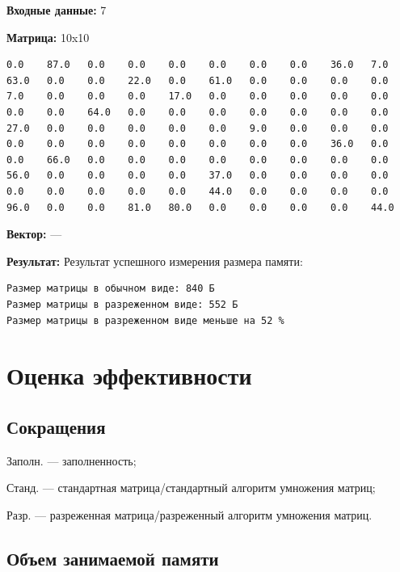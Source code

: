 \documentclass[a4paper,12pt]{extarticle}
\begin{document}
\textbf{Входные данные: }
7

\textbf{Матрица: }
10x10

\begin{verbatim}
0.0    87.0   0.0    0.0    0.0    0.0    0.0    0.0    36.0   7.0    
63.0   0.0    0.0    22.0   0.0    61.0   0.0    0.0    0.0    0.0    
7.0    0.0    0.0    0.0    17.0   0.0    0.0    0.0    0.0    0.0    
0.0    0.0    64.0   0.0    0.0    0.0    0.0    0.0    0.0    0.0    
27.0   0.0    0.0    0.0    0.0    0.0    9.0    0.0    0.0    0.0    
0.0    0.0    0.0    0.0    0.0    0.0    0.0    0.0    36.0   0.0    
0.0    66.0   0.0    0.0    0.0    0.0    0.0    0.0    0.0    0.0    
56.0   0.0    0.0    0.0    0.0    37.0   0.0    0.0    0.0    0.0    
0.0    0.0    0.0    0.0    0.0    44.0   0.0    0.0    0.0    0.0    
96.0   0.0    0.0    81.0   80.0   0.0    0.0    0.0    0.0    44.0
\end{verbatim}

\textbf{Вектор: }
---

\textbf{Результат: }
Результат успешного измерения размера памяти: 

\begin{verbatim}
Размер матрицы в обычном виде: 840 Б
Размер матрицы в разреженном виде: 552 Б
Размер матрицы в разреженном виде меньше на 52 %
\end{verbatim}

\newpage

\section{Оценка эффективности}
\subsection{Сокращения}
Заполн. --- заполненность;

Станд. --- стандартная матрица/стандартный алгоритм умножения матриц;

Разр. --- разреженная матрица/разреженный алгоритм умножения матриц.

\subsection{Объем занимаемой памяти}
\end{document}

